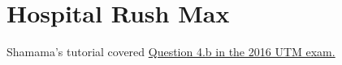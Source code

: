 \documentclass[]{article}
\begin{document}
\section{Hospital Rush Max}
Shamama's tutorial covered \href{https://exams-library-utoronto-ca.myaccess.library.utoronto.ca/bitstream/exams/17962/1/csc373h-d16.pdf}{Question 4.b in the 2016 UTM exam.}
\end{document}
